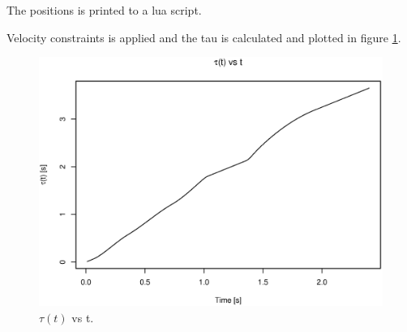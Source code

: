 The positions is printed to a lua script\cite{zip:luaScript}.

Velocity constraints is applied and the tau is calculated and plotted in figure \ref{fig:tau_v_t}.

\begin{figure}
 \centering
 \includegraphics[width=0.7\linewidth]{graphics/timeplot}
 \caption{$\tau(t)$ vs t.}
 \label{fig:tau_v_t}
\end{figure}
